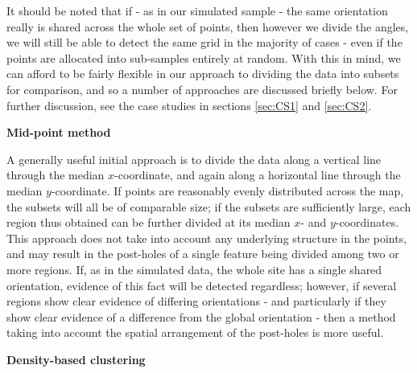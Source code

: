 \documentclass[../../ArchStats.tex]{subfiles}
\begin{document}
It should be noted that if - as in our simulated sample - the same orientation really is shared across the whole set of points, then however we divide the angles, we will still be able to detect the same grid in the majority of cases - even if the points are allocated into sub-samples entirely at random. With this in mind, we can afford to be fairly flexible in our approach to dividing the data into subsets for comparison, and so a number of approaches are discussed briefly below. For further discussion, see the case studies in sections \ref{sec:CS1} and \ref{sec:CS2}.

\textbf{Mid-point method}

A generally useful initial approach is to divide the data along a vertical line through the median $x$-coordinate, and again along a horizontal line through the median $y$-coordinate. If points are reasonably evenly distributed across the map, the subsets will all be of comparable size; if the subsets are sufficiently large, each region thus obtained can be further divided at its median $x$- and $y$-coordinates. This approach does not take into account any underlying structure in the points, and may result in the post-holes of a single feature being divided among two or more regions. If, as in the simulated data, the whole site has a single shared orientation, evidence of this fact will be detected regardless; however, if several regions show clear evidence of differing orientations - and particularly if they show clear evidence of a difference from the global orientation - then a method taking into account the spatial arrangement of the post-holes is more useful.


\textbf{Density-based clustering}
\end{document}
